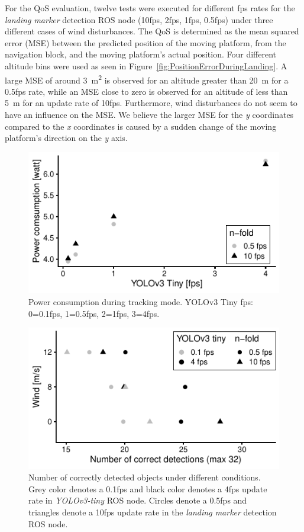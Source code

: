 \documentclass[conference]{IEEEtran}
\begin{document}
For the QoS evaluation, twelve tests were executed for different 
fps rates for the \emph{landing marker} detection ROS node 
(10fps, 2fps, 1fps, 0.5fps) under three different cases of wind
disturbances. The QoS is determined as the  mean squared error (MSE) 
between the predicted position of the moving platform, 
from the navigation block, and the moving platform's actual position. 
Four different altitude bins were used as seen in Figure~\ref{fig:PositionErrorDuringLanding}. A large MSE of around \SI{3}{\square\meter} is observed for an altitude greater than \SI{20}{\meter} for a 0.5fps rate, while an MSE close to zero is observed for an altitude of less than \SI{5}{\meter} for an update rate of 10fps. Furthermore, wind disturbances do not seem to have an influence on the MSE. We believe the larger MSE for the \emph{y} coordinates compared to the \emph{x} coordinates is caused by a sudden change of the moving platform's direction on the \emph{y} axis.

\begin{figure}[t]
  \centering
  \includegraphics{data_visualization/PowerDetection.pdf}
  \caption{Power consumption during tracking mode. YOLOv3 Tiny fps:
    0=0.1fps, 1=0.5fps, 2=1fps, 3=4fps.}
  \label{fig:PowerDuringTracking}
\end{figure}
  
\begin{figure}[t]
  \centering
  \includegraphics{data_visualization/QoSDetection.pdf}
  \caption{Number of correctly detected objects
  under different conditions. 
  Grey color denotes a 0.1fps and black color denotes a 4fps 
  update rate in \emph{YOLOv3-tiny} ROS node. 
  Circles denote a 0.5fps and triangles denote a 10fps update 
  rate in the \emph{landing marker} detection ROS node.}
  \label{fig:NCorrectObjectDetections}
\end{figure}
\end{document}
